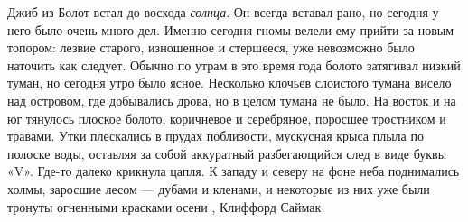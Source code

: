 Джиб из Болот встал до восхода \emph{солнца}. Он всегда вставал рано, но сегодня у
него было очень много дел. Именно сегодня гномы велели ему прийти за новым
топором: лезвие старого, изношенное и стершееся, уже невозможно было наточить
как следует.  Обычно по утрам в это время года болото затягивал низкий туман,
но сегодня утро было ясное. Несколько клочьев слоистого тумана висело над
островом, где добывались дрова, но в целом тумана не было. На восток и на юг
тянулось плоское болото, коричневое и серебряное, поросшее тростником и
травами. Утки плескались в прудах поблизости, мускусная крыса плыла по полоске
воды, оставляя за собой аккуратный разбегающийся след в виде буквы «V». Где-то
далеко крикнула цапля. К западу и северу на фоне неба поднимались холмы,
заросшие лесом — дубами и кленами, и некоторые из них уже были тронуты
огненными красками осени
, Клиффорд Саймак
